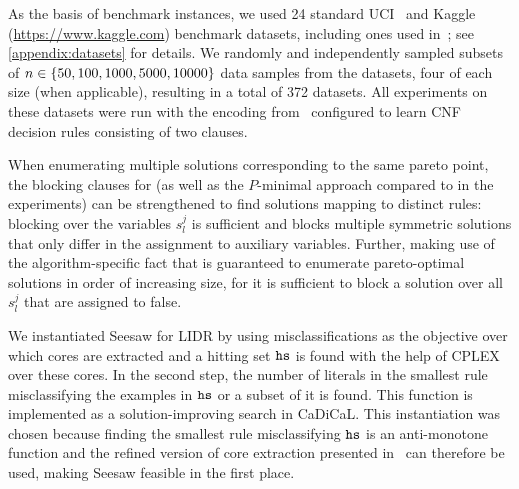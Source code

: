 As the basis of benchmark instances, we used 24 standard UCI~\autocite{UciMlr} and Kaggle ({\small\url{https://www.kaggle.com}}) benchmark datasets, including ones used in~\textcite{DBLP:conf/cp/MaliotovM18}; see \cref{appendix:datasets} for details.
We randomly and independently sampled subsets of $n\in\{50,100,1000,5000,10000\}$ data samples from the datasets, four of each size (when applicable), resulting in a total of 372 datasets. %
All experiments on these datasets were run with the encoding from~\textcite{DBLP:conf/cp/MaliotovM18} configured to learn CNF decision rules consisting of two clauses.

When enumerating multiple solutions corresponding to the same pareto point, the blocking clauses for \algname{} (as well as the $P$-minimal approach compared to in the experiments) can be strengthened to find solutions mapping to distinct rules:
blocking over the variables $s_l^j$ is sufficient and blocks multiple symmetric solutions that only differ in the assignment to auxiliary variables.
Further, making use of the algorithm-specific fact that \algname{} is guaranteed to enumerate pareto-optimal solutions in order of increasing size, for \algname{} it is sufficient to block a solution over all $s_l^j$ that are assigned to false.

We instantiated Seesaw for LIDR by using misclassifications as the objective over which cores are extracted and a hitting set $\texttt{hs}$ is found with the help of CPLEX over these cores.
In the second step, the number of literals in the smallest rule misclassifying the examples in $\texttt{hs}$ or a subset of it is found.
This function is implemented as a solution-improving search in CaDiCaL.
This instantiation was chosen because finding the smallest rule misclassifying $\texttt{hs}$ is an anti-monotone function and the refined version of core extraction presented in~\textcite{DBLP:conf/cp/JanotaMSM21} can therefore be used, making Seesaw feasible in the first place.

